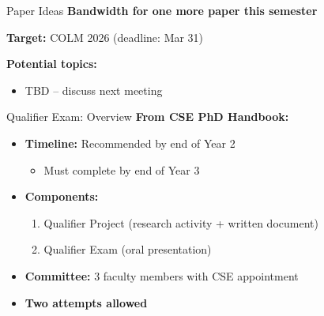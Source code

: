 \documentclass{beamer}
\begin{document}
\begin{frame}{Paper Ideas}
\textbf{Bandwidth for one more paper this semester}

\vspace{0.5cm}
\textbf{Target:} COLM 2026 (deadline: Mar 31)

\vspace{0.5cm}
\textbf{Potential topics:}
\begin{itemize}
    \item TBD -- discuss next meeting
\end{itemize}
\end{frame}

\begin{frame}{Qualifier Exam: Overview}
\textbf{From CSE PhD Handbook:}

\vspace{0.3cm}
\begin{itemize}
    \item \textbf{Timeline:} Recommended by end of Year 2
    \begin{itemize}
        \item Must complete by end of Year 3
    \end{itemize}
    
    \vspace{0.2cm}
    \item \textbf{Components:}
    \begin{enumerate}
        \item Qualifier Project (research activity + written document)
        \item Qualifier Exam (oral presentation)
    \end{enumerate}
    
    \vspace{0.2cm}
    \item \textbf{Committee:} 3 faculty members with CSE appointment
    
    \vspace{0.2cm}
    \item \textbf{Two attempts allowed}
\end{itemize}
\end{frame}
\end{document}
